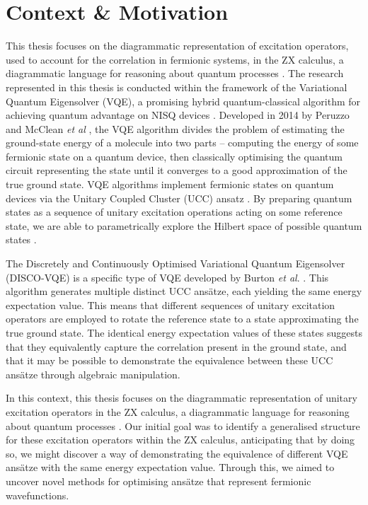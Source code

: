 \section{Context \& Motivation}%
\label{context-motivation}

This thesis focuses on the diagrammatic representation of excitation operators, used to account for the correlation in fermionic systems, in the ZX calculus, a diagrammatic language for reasoning about quantum processes \cite{Coecke2011}. The research represented in this thesis is conducted within the framework of the Variational Quantum Eigensolver (VQE), a promising hybrid quantum-classical algorithm for achieving quantum advantage on NISQ devices \cite{Cerezo2020}. Developed in 2014 by Peruzzo and McClean \textit{et al} \cite{Peruzzo2014}, the VQE algorithm divides the problem of estimating the ground-state energy of a molecule into two parts -- computing the energy of some fermionic state on a quantum device, then classically optimising the quantum circuit representing the state until it converges to a good approximation of the true ground state. VQE algorithms implement fermionic states on quantum devices via the Unitary Coupled Cluster (UCC) ansatz \cite{Taube2006}. By preparing quantum states as a sequence of unitary excitation operations acting on some reference state, we are able to parametrically explore the Hilbert space of possible quantum states \cite{McClean2016}.

The Discretely and Continuously Optimised Variational Quantum Eigensolver (DISCO-VQE) is a specific type of VQE developed by Burton \textit{et al}. \cite{Burton2023}. This algorithm generates multiple distinct UCC ansätze, each yielding the same energy expectation value. This means that different sequences of unitary excitation operators are employed to rotate the reference state to a state approximating the true ground state. The identical energy expectation values of these states suggests that they equivalently capture the correlation present in the ground state, and that it may be possible to demonstrate the equivalence between these UCC ansätze through algebraic manipulation.

In this context, this thesis focuses on the diagrammatic representation of unitary excitation operators in the ZX calculus, a diagrammatic language for reasoning about quantum processes \cite{Coecke2011}. Our initial goal was to identify a generalised structure for these excitation operators within the ZX calculus, anticipating that by doing so, we might discover a way of demonstrating the equivalence of different VQE ansätze with the same energy expectation value. Through this, we aimed to uncover novel methods for optimising ansätze that represent fermionic wavefunctions.

